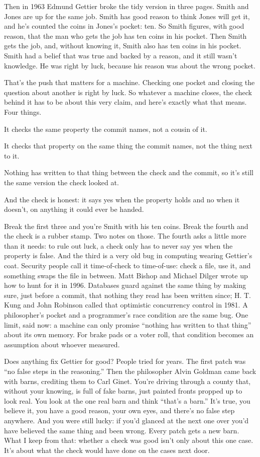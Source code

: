 \documentclass[11pt,twoside]{article}
\theoremstyle{thielethm}
\theoremstyle{thieledef}
\theoremstyle{thieledef}
\theoremstyle{thieledef}
\theoremstyle{thielethm}
\theoremstyle{thieleobs}
\theoremstyle{thielethm}
\begin{document}
Then in 1963 Edmund Gettier broke the tidy version in three pages. Smith and Jones are up for the same job. Smith has good reason to think Jones will get it, and he's counted the coins in Jones's pocket: ten. So Smith figures, with good reason, that the man who gets the job has ten coins in his pocket. Then Smith gets the job, and, without knowing it, Smith also has ten coins in his pocket. Smith had a belief that was true and backed by a reason, and it still wasn't knowledge. He was right by luck, because his reason was about the wrong pocket.

That's the push that matters for a machine. Checking one pocket and closing the question about another is right by luck. So whatever a machine closes, the check behind it has to be about this very claim, and here's exactly what that means. Four things.

It checks the same property the commit names, not a cousin of it.

It checks that property on the same thing the commit names, not the thing next to it.

Nothing has written to that thing between the check and the commit, so it's still the same version the check looked at.

And the check is honest: it says yes when the property holds and no when it doesn't, on anything it could ever be handed.

Break the first three and you're Smith with his ten coins. Break the fourth and the check is a rubber stamp. Two notes on those. The fourth asks a little more than it needs: to rule out luck, a check only has to never say yes when the property is false. And the third is a very old bug in computing wearing Gettier's coat. Security people call it time-of-check to time-of-use: check a file, use it, and something swaps the file in between. Matt Bishop and Michael Dilger wrote up how to hunt for it in 1996. Databases guard against the same thing by making sure, just before a commit, that nothing they read has been written since; H. T. Kung and John Robinson called that optimistic concurrency control in 1981. A philosopher's pocket and a programmer's race condition are the same bug. One limit, said now: a machine can only promise ``nothing has written to that thing'' about its own memory. For brake pads or a voter roll, that condition becomes an assumption about whoever measured.

Does anything fix Gettier for good? People tried for years. The first patch was ``no false steps in the reasoning.'' Then the philosopher Alvin Goldman came back with barns, crediting them to Carl Ginet. You're driving through a county that, without your knowing, is full of fake barns, just painted fronts propped up to look real. You look at the one real barn and think ``that's a barn.'' It's true, you believe it, you have a good reason, your own eyes, and there's no false step anywhere. And you were still lucky: if you'd glanced at the next one over you'd have believed the same thing and been wrong. Every patch gets a new barn. What I keep from that: whether a check was good isn't only about this one case. It's about what the check would have done on the cases next door.
\end{document}

